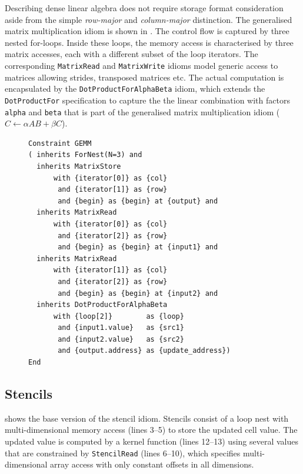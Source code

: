     Describing dense linear algebra does not require storage format
    consideration aside from the simple {\it row-major} and {\it column-major}
    distinction.
    The generalised matrix multiplication idiom is shown in .
    The control flow is captured by three nested for-loops.
    Inside these loops, the memory access is characterised by three matrix
    accesses, each with a different subset of the loop iterators.
    The corresponding \texttt{MatrixRead} and \texttt{MatrixWrite} idioms model
    generic access to matrices allowing strides, transposed matrices etc.
    The actual computation is encapsulated by the
    \texttt{DotProductForAlphaBeta} idiom, which extends the
    \texttt{DotProductFor} specification to capture the the linear combination
    with factors \texttt{alpha} and \texttt{beta} that is part of the
    generalised matrix multiplication idiom ($C\gets\alpha AB+\beta C$).

\begin{figure}[H]
\begin{lstlisting}[language=IDL, label={fig:gemm}, caption=
   {IDL specification of the generalised dense matrix-vector multiplication
    (GEMM)\leftskip=0pt\rightskip=0pt}]
Constraint GEMM
( inherits ForNest(N=3) and
  inherits MatrixStore
      with {iterator[0]} as {col}
       and {iterator[1]} as {row}
       and {begin} as {begin} at {output} and
  inherits MatrixRead
      with {iterator[0]} as {col}
       and {iterator[2]} as {row}
       and {begin} as {begin} at {input1} and
  inherits MatrixRead
      with {iterator[1]} as {col}
       and {iterator[2]} as {row}
       and {begin} as {begin} at {input2} and
  inherits DotProductForAlphaBeta
      with {loop[2]}        as {loop}
       and {input1.value}   as {src1}
       and {input2.value}   as {src2}
       and {output.address} as {update_address})
End
\end{lstlisting}
\end{figure}

\subsection{Stencils}

     shows the base version of the stencil idiom.
    Stencils consist of a loop nest with multi-dimensional memory access
    (lines 3--5) to store the updated cell value.
    The updated value is computed by a kernel function (lines 12--13) using
    several values that are constrained by \texttt{StencilRead} (lines 6--10),
    which specifies multi-dimensional array access with only constant offsets in
    all dimensions.

